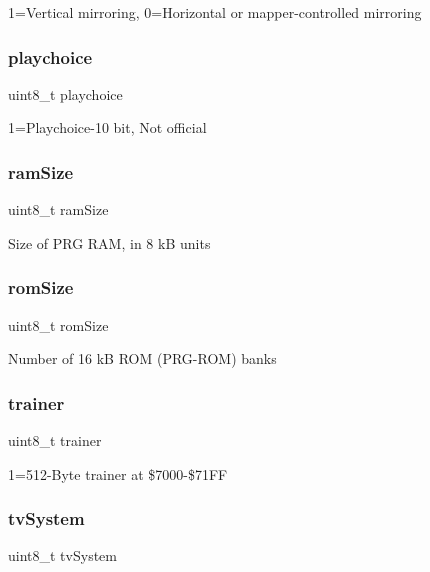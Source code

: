 1=Vertical mirroring, 0=Horizontal or mapper-\/controlled mirroring \mbox{\label{struct_header_af63447dae4fa0b3b191c17e93d4b8308}} 
\subsubsection{\texorpdfstring{playchoice}{playchoice}}
{\footnotesize\ttfamily uint8\+\_\+t playchoice}

1=Playchoice-\/10 bit, Not official \mbox{\label{struct_header_a31d9b2a2cceaa5d61eb13f86a040d3ab}} 
\subsubsection{\texorpdfstring{ram\+Size}{ramSize}}
{\footnotesize\ttfamily uint8\+\_\+t ram\+Size}

Size of P\+RG R\+AM, in 8 kB units \mbox{\label{struct_header_abc17b83f6b13b83428472dfa9221bfb5}} 
\subsubsection{\texorpdfstring{rom\+Size}{romSize}}
{\footnotesize\ttfamily uint8\+\_\+t rom\+Size}

Number of 16 kB R\+OM (P\+R\+G-\/\+R\+OM) banks \mbox{\label{struct_header_a8038f4af17204ad75f2790932777abea}} 
\subsubsection{\texorpdfstring{trainer}{trainer}}
{\footnotesize\ttfamily uint8\+\_\+t trainer}

1=512-\/\+Byte trainer at \$7000-\/\$71\+FF \mbox{\label{struct_header_a61db4097a2c0c337f74b4b78af94b3bc}} 
\subsubsection{\texorpdfstring{tv\+System}{tvSystem}}
{\footnotesize\ttfamily uint8\+\_\+t tv\+System}

